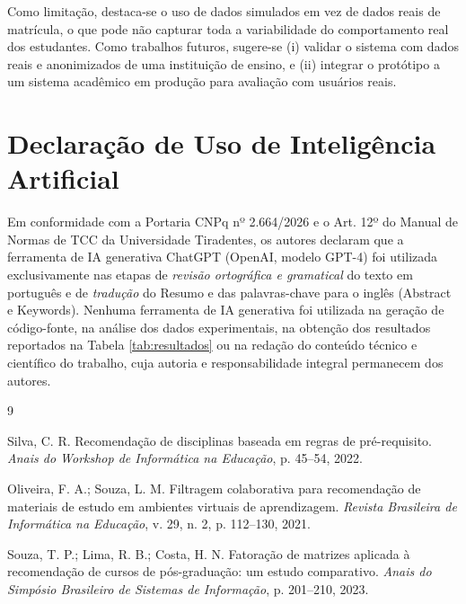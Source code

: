 \documentclass[a4paper,12pt]{article}
\begin{document}
Como limitação, destaca-se o uso de dados simulados em vez de dados reais
de matrícula, o que pode não capturar toda a variabilidade do
comportamento real dos estudantes. Como trabalhos futuros, sugere-se (i)
validar o sistema com dados reais e anonimizados de uma instituição de
ensino, e (ii) integrar o protótipo a um sistema acadêmico em produção
para avaliação com usuários reais.

\section*{Declaração de Uso de Inteligência Artificial}

Em conformidade com a Portaria CNPq nº 2.664/2026 e o Art. 12º do Manual
de Normas de TCC da Universidade Tiradentes, os autores declaram que a
ferramenta de IA generativa ChatGPT (OpenAI, modelo GPT-4) foi utilizada
exclusivamente nas etapas de \emph{revisão ortográfica e gramatical} do
texto em português e de \emph{tradução} do Resumo e das palavras-chave
para o inglês (Abstract e Keywords). Nenhuma ferramenta de IA generativa
foi utilizada na geração de código-fonte, na análise dos dados
experimentais, na obtenção dos resultados reportados na Tabela
\ref{tab:resultados} ou na redação do conteúdo técnico e científico do
trabalho, cuja autoria e responsabilidade integral permanecem dos
autores.

\begin{thebibliography}{9}

Silva, C. R.
\newblock Recomendação de disciplinas baseada em regras de pré-requisito.
\newblock \emph{Anais do Workshop de Informática na Educação}, p. 45--54, 2022.

Oliveira, F. A.; Souza, L. M.
\newblock Filtragem colaborativa para recomendação de materiais de estudo
em ambientes virtuais de aprendizagem.
\newblock \emph{Revista Brasileira de Informática na Educação}, v. 29,
n. 2, p. 112--130, 2021.

Souza, T. P.; Lima, R. B.; Costa, H. N.
\newblock Fatoração de matrizes aplicada à recomendação de cursos de
pós-graduação: um estudo comparativo.
\newblock \emph{Anais do Simpósio Brasileiro de Sistemas de Informação},
p. 201--210, 2023.

\end{thebibliography}
\end{document}
